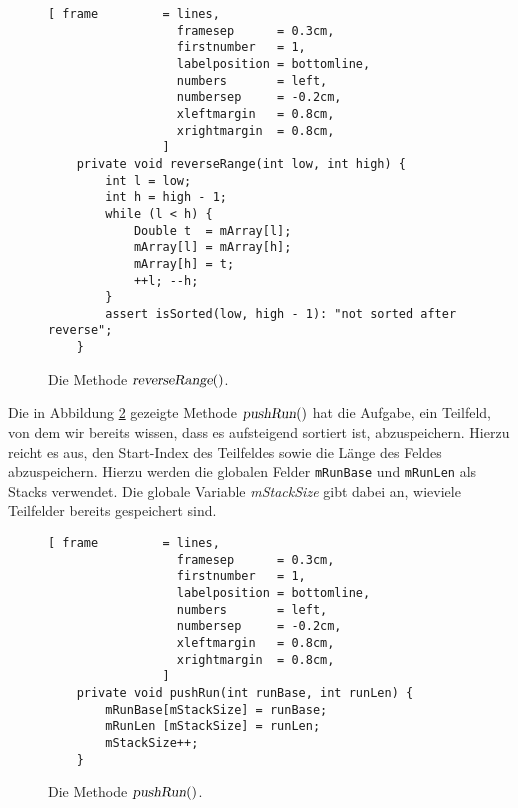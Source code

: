 \begin{figure}[!ht]
\centering
\begin{Verbatim}[ frame         = lines, 
                  framesep      = 0.3cm, 
                  firstnumber   = 1,
                  labelposition = bottomline,
                  numbers       = left,
                  numbersep     = -0.2cm,
                  xleftmargin   = 0.8cm,
                  xrightmargin  = 0.8cm,
                ]
    private void reverseRange(int low, int high) {
        int l = low;
        int h = high - 1;
        while (l < h) {
            Double t  = mArray[l];
            mArray[l] = mArray[h];
            mArray[h] = t;
            ++l; --h;
        }
        assert isSorted(low, high - 1): "not sorted after reverse";
    }
\end{Verbatim}
\vspace*{-0.3cm}
\caption{Die Methode $\textsl{reverseRange}()$.}
\label{fig:TimSort.java:reverseRange}
\end{figure}

Die in Abbildung \ref{fig:TimSort.java:pushRun} gezeigte Methode $\textsl{pushRun}()$ hat die
Aufgabe, ein Teilfeld, von dem wir bereits wissen, dass es aufsteigend sortiert ist,
abzuspeichern. Hierzu reicht es aus, den Start-Index des Teilfeldes sowie die L\"ange des Feldes
abzuspeichern.   Hierzu werden die globalen Felder \texttt{mRunBase} und \texttt{mRunLen} als Stacks
verwendet.  Die globale Variable \textsl{mStackSize} gibt dabei an, wieviele Teilfelder bereits
gespeichert sind.

\begin{figure}[!ht]
\centering
\begin{Verbatim}[ frame         = lines, 
                  framesep      = 0.3cm, 
                  firstnumber   = 1,
                  labelposition = bottomline,
                  numbers       = left,
                  numbersep     = -0.2cm,
                  xleftmargin   = 0.8cm,
                  xrightmargin  = 0.8cm,
                ]
    private void pushRun(int runBase, int runLen) {
        mRunBase[mStackSize] = runBase;
        mRunLen [mStackSize] = runLen;
        mStackSize++;
    }
\end{Verbatim}
\vspace*{-0.3cm}
\caption{Die Methode $\textsl{pushRun}()$.}
\label{fig:TimSort.java:pushRun}
\end{figure}


